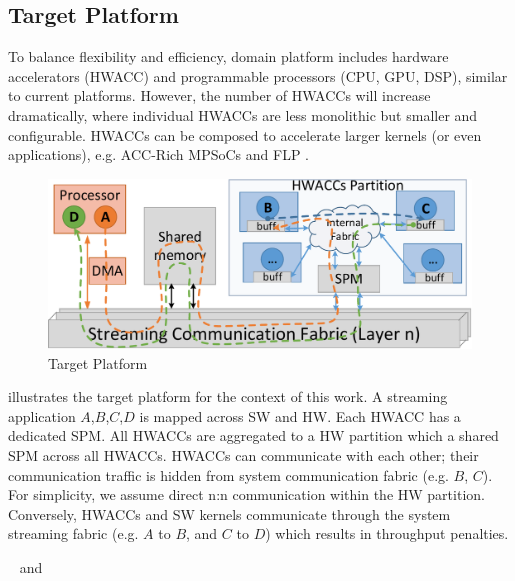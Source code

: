 \subsection{Target Platform}
\label{sec:Platform}

To balance flexibility and efficiency, domain platform includes hardware accelerators (HWACC) and programmable processors (CPU, GPU, DSP), similar to current platforms. However, the number of HWACCs will increase dramatically, where individual HWACCs are less monolithic but smaller and configurable. HWACCs can be composed to accelerate larger kernels (or even applications), e.g. ACC-Rich MPSoCs \cite{cong2014accelerator} and FLP \cite{tabkhi2014function}. 

\begin{figure}[h]
	\centering
	\includegraphics[width=.65\linewidth]{fig/pPlat.pdf}
	\caption{Target Platform}
	\label{fig:plat}
\end{figure}

 illustrates the target platform for the context of this work. A streaming application $A$,$B$,$C$,$D$ is mapped across SW and HW. Each HWACC has a dedicated SPM. All HWACCs are aggregated to a HW partition which a shared SPM across all HWACCs. HWACCs can communicate with each other; their communication traffic is hidden from system communication fabric (e.g. $B$, $C$). For simplicity, we assume direct n:n communication within the HW partition. Conversely, HWACCs and SW kernels communicate through the system streaming fabric (e.g. $A$ to $B$, and $C$ to $D$) which results in throughput penalties.



~ and ~ 